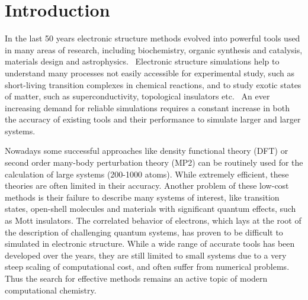 \chapter{Introduction
\label{ch:introduction}}
In the last 50 years electronic structure methods evolved into powerful tools 
used in many areas of research, including biochemistry, organic 
synthesis and catalysis, materials design and 
astrophysics.~\cite{young2004computational} 
Electronic structure simulations help to understand many processes not easily 
accessible for experimental study, such as short-living transition complexes in 
chemical reactions, and to study exotic states of matter, such as 
superconductivity, topological insulators 
etc.~\cite{imada1998metal,qi2011topological} An ever increasing demand for 
reliable simulations requires a constant increase in both the accuracy of 
existing tools and their performance to simulate larger and 
larger systems. 

Nowadays some successful approaches like density functional theory 
(DFT) or second order many-body perturbation theory (MP2) can be routinely used 
for the calculation of large systems (200-1000 atoms). While 
extremely efficient, these theories are often limited in their accuracy. 
Another problem of these low-cost methods is their failure to 
describe many systems of interest, like transition states, open-shell molecules 
and materials with significant quantum effects, such as Mott insulators. The 
correlated behavior of electrons, which lays at the root of the 
description of challenging quantum systems, has proven to be difficult to 
simulated in electronic structure. While a wide range of accurate tools has been
developed over the years, they are still limited to small systems due to a very 
steep scaling of computational cost, and often suffer from numerical problems. 
Thus the search for effective methods remains an active topic of modern 
computational chemistry.

